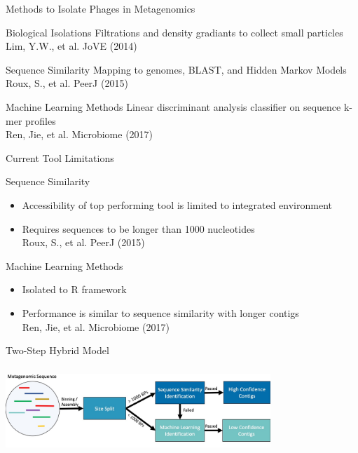 \documentclass[11pt, xcolor=table]{beamer}
\begin{document}
  \begin{frame}{Methods to Isolate Phages in Metagenomics}
  \begin{block}{Biological Isolations}
  Filtrations and density gradiants to collect small particles \\
  {\tiny Lim, Y.W., et al. JoVE (2014)}
  \end{block}
  \begin{block}{Sequence Similarity}
  Mapping to genomes, BLAST, and Hidden Markov Models \\ 
  {\tiny Roux, S., et al. PeerJ (2015)}
  \end{block}
  \begin{block}{Machine Learning Methods}
  Linear discriminant analysis classifier on sequence k-mer profiles \\
  {\tiny Ren, Jie, et al. Microbiome (2017)}
  \end{block}
  \end{frame}
  \begin{frame}{Current Tool Limitations}
  \begin{block}{Sequence Similarity}
  \begin{itemize}
  \item Accessibility of top performing tool is limited to integrated environment
  \item Requires sequences to be longer than 1000 nucleotides \\
  {\tiny Roux, S., et al. PeerJ (2015)}
  \end{itemize}
  \end{block}
  \begin{block}{Machine Learning Methods}
  \begin{itemize}
  \item Isolated to R framework
  \item Performance is similar to sequence similarity with longer contigs \\
  {\tiny Ren, Jie, et al. Microbiome (2017)}
  \end{itemize}
  \end{block}
  \end{frame}
  \begin{frame}{Two-Step Hybrid Model}
  \center
	\includegraphics[height=4cm, width=10cm]{CPBS_11_18/TwoStep.jpg}
  
  \end{frame}
\end{document}
